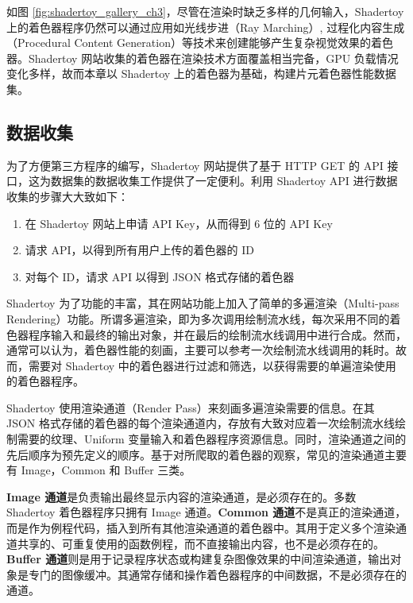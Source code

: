 如图 \ref{fig:shadertoy_gallery_ch3}，尽管在渲染时缺乏多样的几何输入，{\amend Shadertoy 上的着色器程序}仍然可以通过应用如光线步进（Ray Marching）\cite{Hart1996}, 过程化内容生成（Procedural Content Generation）等技术来创建能够产生复杂视觉效果的着色器。Shadertoy 网站收集的着色器在渲染技术方面覆盖相当完备{\amend，GPU 负载情况变化多样}，故而{\amend 本章}以 Shadertoy 上的着色器为基础，构建片元着色器性能数据集。

\subsection{数据收集}

为了方便第三方程序的编写，Shadertoy 网站提供了基于 HTTP GET 的 API 接口，这为{\amend 数据集的}数据收集工作提供了一定便利。利用 Shadertoy API 进行数据收集的步骤大大致如下：

\begin{enumerate}
    \item 在 Shadertoy 网站上申请 API Key，从而得到 6 位的 API Key
    \item 请求 API，以得到所有用户上传的着色器的 ID
    \item 对每个 ID，请求 API 以得到 JSON 格式存储的着色器
\end{enumerate}

{\added Shadertoy 为了功能的丰富，其在网站功能上加入了简单的多遍渲染（Multi-pass Rendering）功能。所谓多遍渲染，即为多次调用绘制流水线，每次采用不同的着色器程序输入和最终的输出对象，并在最后的绘制流水线调用中进行合成。然而，通常可以认为，着色器性能的刻画，主要可以参考一次绘制流水线调用的耗时。故而，需要对 Shadertoy 中的着色器进行过滤和筛选，以获得需要的单遍渲染使用的着色器程序。}

Shadertoy 使用渲染通道（Render Pass）来刻画多遍渲染需要的信息。在其 JSON 格式存储的着色器的每个渲染通道内，存放有大致对应着一次绘制流水线绘制需要的纹理、Uniform 变量输入和着色器程序资源信息。同时，渲染通道之间的先后顺序为预先定义的顺序。基于对所爬取的着色器的观察，常见的渲染通道主要有 Image，Common 和 Buffer 三类。

{\bf Image 通道}是负责输出最终显示内容的渲染通道，是必须存在的。多数 Shadertoy 着色器程序只拥有 Image 通道。{\bf Common 通道}不是真正的渲染通道，而是作为例程代码，插入到所有其他渲染通道的着色器中。其用于定义多个渲染通道共享的、可重复使用的函数例程，而不直接输出内容，也不是必须存在的。{\bf Buffer 通道}则是用于记录程序状态或构建复杂图像效果的中间渲染通道，输出对象是专门的图像缓冲。其通常存储和操作着色器程序的中间数据，不是必须存在的通道。

